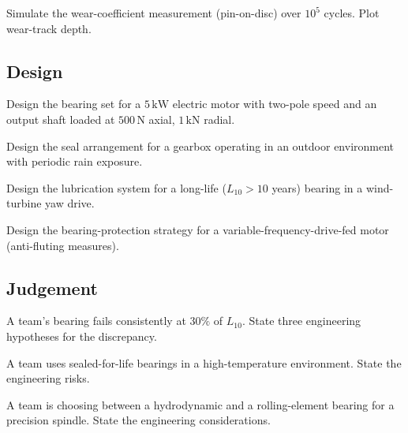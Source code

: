 \begin{exercise}
Simulate the wear-coefficient measurement (pin-on-disc) over $10^5$ cycles. Plot wear-track depth.
\end{exercise}

\subsection*{Design}

\begin{exercise}
Design the bearing set for a $5\,\si{\kilo\watt}$ electric motor with two-pole speed and an output shaft loaded at $500\,\si{\newton}$ axial, $1\,\si{\kilo\newton}$ radial.
\end{exercise}

\begin{exercise}
Design the seal arrangement for a gearbox operating in an outdoor environment with periodic rain exposure.
\end{exercise}

\begin{exercise}
Design the lubrication system for a long-life ($L_{10} > 10$ years) bearing in a wind-turbine yaw drive.
\end{exercise}

\begin{exercise}
Design the bearing-protection strategy for a variable-frequency-drive-fed motor (anti-fluting measures).
\end{exercise}

\subsection*{Judgement}

\begin{exercise}
A team's bearing fails consistently at $30\%$ of $L_{10}$. State three engineering hypotheses for the discrepancy.
\end{exercise}

\begin{exercise}
A team uses sealed-for-life bearings in a high-temperature environment. State the engineering risks.
\end{exercise}

\begin{exercise}
A team is choosing between a hydrodynamic and a rolling-element bearing for a precision spindle. State the engineering considerations.
\end{exercise}

